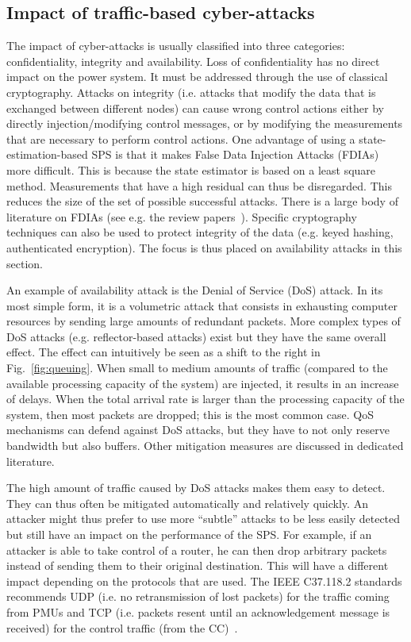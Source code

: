 \subsection{Impact of traffic-based cyber-attacks}
\label{sec:ICTtrafficAttack}

The impact of cyber-attacks is usually classified into three categories: confidentiality, integrity and availability. Loss of confidentiality has no direct impact on the power system. It must be addressed through the use of classical cryptography. Attacks on integrity (i.e. attacks that modify the data that is exchanged between different nodes) can cause wrong control actions either by directly injection/modifying control messages, or by modifying the measurements that are necessary to perform control actions. One advantage of using a state-estimation-based SPS is that it makes False Data Injection Attacks (FDIAs) more difficult. This is because the state estimator is based on a least square method. Measurements that have a high residual can thus be disregarded. This reduces the size of the set of possible successful attacks. There is a large body of literature on FDIAs (see e.g. the review papers~\cite{FDIAreview, FDIAreview2}). Specific cryptography techniques can also be used to protect integrity of the data (e.g. keyed hashing, authenticated encryption). The focus is thus placed on availability attacks in this section.

An example of availability attack is the Denial of Service (DoS) attack. In its most simple form, it is a volumetric attack that consists in exhausting computer resources by sending large amounts of redundant packets. More complex types of DoS attacks (e.g. reflector-based attacks) exist but they have the same overall effect. The effect can intuitively be seen as a shift to the right in Fig.~\ref{fig:queuing}. When small to medium amounts of traffic (compared to the available processing capacity of the system) are injected, it results in an increase of delays. When the total arrival rate is larger than the processing capacity of the system, then most packets are dropped; this is the most common case. QoS mechanisms can defend against DoS attacks, but they have to not only reserve bandwidth but also buffers. Other mitigation measures are discussed in dedicated literature.

The high amount of traffic caused by DoS attacks makes them easy to detect. They can thus often be mitigated automatically and relatively quickly. An attacker might thus prefer to use more ``subtle'' attacks to be less easily detected but still have an impact on the performance of the SPS. For example, if an attacker is able to take control of a router, he can then drop arbitrary packets instead of sending them to their original destination. This will have a different impact depending on the protocols that are used. The IEEE C37.118.2 standards recommends UDP (i.e. no retransmission of lost packets) for the traffic coming from PMUs and TCP (i.e. packets resent until an acknowledgement message is received) for the control traffic (from the CC)~\cite{StandardC37-118-2}.

